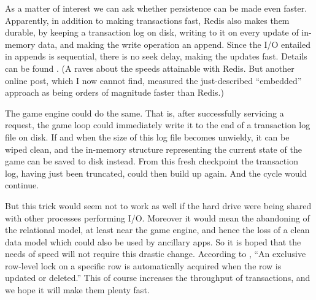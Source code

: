 As a matter of interest we can ask whether persistence can be made even faster.
Apparently, in addition to making transactions fast, Redis also makes them
durable, by keeping a transaction log on disk, writing to it on every update of
in-memory data, and making the write operation an append.
Since the I/O entailed in appends is sequential, there is no seek delay,
making the updates fast.
Details can be found
.
(A 
raves about the speeds attainable with Redis.
But another online post, which I now cannot find, measured the just-described
``embedded'' approach as being orders of magnitude faster than Redis.)

The game engine could do the same.
That is, after successfully servicing a request,
the game loop could immediately write it to the end of a transaction
log file on disk.
If and when the size of this log file becomes unwieldy,
it can be wiped clean, and the in-memory structure representing the current
state of the game can be saved to disk instead.
From this fresh checkpoint the transaction log, having just been truncated,
could then build up again.
And the cycle would continue.

But this trick would seem not to work as well if the hard drive were being
shared with other processes performing I/O. Moreover it would mean the
abandoning of the relational model, at least near the game engine, and hence
the loss of a clean data model which could also be used by ancillary apps.
So it is hoped that the needs of speed will not require this drastic change.
According to
,
``An exclusive row-level lock on a specific row is automatically acquired when
the row is updated or deleted.'' This of course increases the throughput of
transactions, and we hope it will make them plenty fast.

